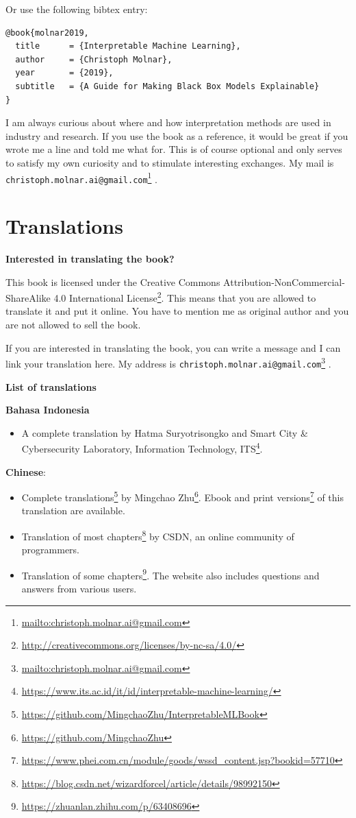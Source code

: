 \documentclass[
  11pt,
]{scrbook}
\providecommand{\tightlist}{%
  \setlength{\itemsep}{0pt}\setlength{\parskip}{0pt}}
\renewcommand{\href}[2]{#2\footnote{\url{#1}}}
\begin{document}
Or use the following bibtex entry:

\begin{verbatim}
@book{molnar2019,
  title      = {Interpretable Machine Learning},
  author     = {Christoph Molnar},
  year       = {2019},
  subtitle   = {A Guide for Making Black Box Models Explainable}
}
\end{verbatim}

I am always curious about where and how interpretation methods are used in industry and research.
If you use the book as a reference, it would be great if you wrote me a line and told me what for.
This is of course optional and only serves to satisfy my own curiosity and to stimulate interesting exchanges.
My mail is \href{mailto:christoph.molnar.ai@gmail.com}{\nolinkurl{christoph.molnar.ai@gmail.com}} .

\hypertarget{translations}{%
\chapter{Translations}\label{translations}}

\textbf{Interested in translating the book?}

This book is licensed under the \href{http://creativecommons.org/licenses/by-nc-sa/4.0/}{Creative Commons Attribution-NonCommercial-ShareAlike 4.0 International License}.
This means that you are allowed to translate it and put it online.
You have to mention me as original author and you are not allowed to sell the book.

If you are interested in translating the book, you can write a message and I can link your translation here.
My address is \href{mailto:christoph.molnar.ai@gmail.com}{\nolinkurl{christoph.molnar.ai@gmail.com}} .

\textbf{List of translations}

\textbf{Bahasa Indonesia}

\begin{itemize}
\tightlist
\item
  \href{https://www.its.ac.id/it/id/interpretable-machine-learning/}{A complete translation by Hatma Suryotrisongko and Smart City \& Cybersecurity Laboratory, Information Technology, ITS}.
\end{itemize}

\textbf{Chinese}:

\begin{itemize}
\tightlist
\item
  \href{https://github.com/MingchaoZhu/InterpretableMLBook}{Complete translations} by \href{https://github.com/MingchaoZhu}{Mingchao Zhu}. \href{https://www.phei.com.cn/module/goods/wssd_content.jsp?bookid=57710}{Ebook and print versions} of this translation are available.
\item
  \href{https://blog.csdn.net/wizardforcel/article/details/98992150}{Translation of most chapters} by CSDN, an online community of programmers.
\item
  \href{https://zhuanlan.zhihu.com/p/63408696}{Translation of some chapters}. The website also includes questions and answers from various users.
\end{itemize}
\end{document}
